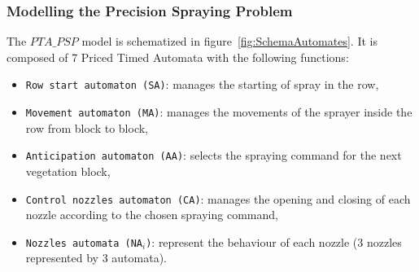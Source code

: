 \documentclass[preprint,3p,times,twocolumn]{elsarticle}
\begin{document}
\subsubsection{Modelling the Precision Spraying Problem} \label{sec:modellingSpraying}

The $PTA\_PSP$ model is schematized in figure~\ref{fig:SchemaAutomates}. It is composed of 7 Priced Timed Automata with the following functions:
\begin{itemize}
\item \texttt{Row start automaton (SA)}: manages the starting of spray in the row,
\item \texttt{Movement automaton (MA)}: manages the movements of the sprayer inside the row from block to block,
\item \texttt{Anticipation automaton (AA)}: selects the spraying command for the next vegetation block,
\item \texttt{Control nozzles automaton (CA)}: manages the opening and closing of each nozzle according to the chosen spraying command,
\item \texttt{Nozzles automata (NA$_i$)}: represent the behaviour of each nozzle (3 nozzles represented by 3 automata).
\end{itemize}
\end{document}
